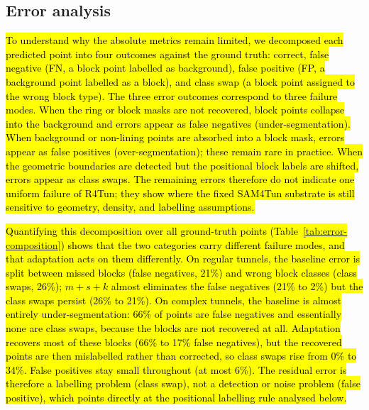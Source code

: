 \documentclass[a4paper,fleqn]{cas-dc}
\begin{document}
{\subsection{Error analysis}\label{sec:error-analysis}

\hl{To understand why the absolute metrics remain limited, we decomposed each predicted point into four outcomes against the ground truth: correct, false negative (FN, a block point labelled as background), false positive (FP, a background point labelled as a block), and class swap (a block point assigned to the wrong block type). The three error outcomes correspond to three failure modes. When the ring or block masks are not recovered, block points collapse into the background and errors appear as false negatives (under-segmentation). When background or non-lining points are absorbed into a block mask, errors appear as false positives (over-segmentation); these remain rare in practice. When the geometric boundaries are detected but the positional block labels are shifted, errors appear as class swaps. The remaining errors therefore do not indicate one uniform failure of R4Tun; they show where the fixed SAM4Tun substrate is still sensitive to geometry, density, and labelling assumptions.}

\hl{Quantifying this decomposition over all ground-truth points (Table~\ref{tab:error-composition}) shows that the two categories carry different failure modes, and that adaptation acts on them differently. On regular tunnels, the baseline error is split between missed blocks (false negatives, 21\%) and wrong block classes (class swaps, 26\%); \mbox{$m+s+k$} almost eliminates the false negatives (21\% to 2\%) but the class swaps persist (26\% to 21\%). On complex tunnels, the baseline is almost entirely under-segmentation: 66\% of points are false negatives and essentially none are class swaps, because the blocks are not recovered at all. Adaptation recovers most of these blocks (66\% to 17\% false negatives), but the recovered points are then mislabelled rather than corrected, so class swaps rise from 0\% to 34\%. False positives stay small throughout (at most 6\%). The residual error is therefore a labelling problem (class swap), not a detection or noise problem (false positive), which points directly at the positional labelling rule analysed below.}

}
\end{document}
